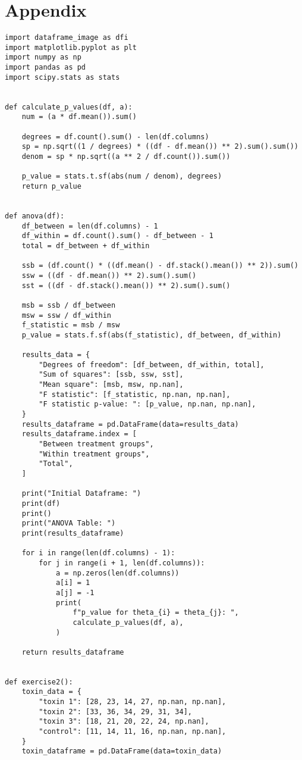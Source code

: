 \documentclass[letterpaper, 12pt]{article}
\begin{document}
\newpage
\section*{Appendix}
\begin{lstlisting}
import dataframe_image as dfi
import matplotlib.pyplot as plt
import numpy as np
import pandas as pd
import scipy.stats as stats


def calculate_p_values(df, a):
    num = (a * df.mean()).sum()

    degrees = df.count().sum() - len(df.columns)
    sp = np.sqrt((1 / degrees) * ((df - df.mean()) ** 2).sum().sum())
    denom = sp * np.sqrt((a ** 2 / df.count()).sum())

    p_value = stats.t.sf(abs(num / denom), degrees)
    return p_value


def anova(df):
    df_between = len(df.columns) - 1
    df_within = df.count().sum() - df_between - 1
    total = df_between + df_within

    ssb = (df.count() * ((df.mean() - df.stack().mean()) ** 2)).sum()
    ssw = ((df - df.mean()) ** 2).sum().sum()
    sst = ((df - df.stack().mean()) ** 2).sum().sum()

    msb = ssb / df_between
    msw = ssw / df_within
    f_statistic = msb / msw
    p_value = stats.f.sf(abs(f_statistic), df_between, df_within)

    results_data = {
        "Degrees of freedom": [df_between, df_within, total],
        "Sum of squares": [ssb, ssw, sst],
        "Mean square": [msb, msw, np.nan],
        "F statistic": [f_statistic, np.nan, np.nan],
        "F statistic p-value: ": [p_value, np.nan, np.nan],
    }
    results_dataframe = pd.DataFrame(data=results_data)
    results_dataframe.index = [
        "Between treatment groups",
        "Within treatment groups",
        "Total",
    ]

    print("Initial Dataframe: ")
    print(df)
    print()
    print("ANOVA Table: ")
    print(results_dataframe)

    for i in range(len(df.columns) - 1):
        for j in range(i + 1, len(df.columns)):
            a = np.zeros(len(df.columns))
            a[i] = 1
            a[j] = -1
            print(
                f"p_value for theta_{i} = theta_{j}: ",
                calculate_p_values(df, a),
            )

    return results_dataframe


def exercise2():
    toxin_data = {
        "toxin 1": [28, 23, 14, 27, np.nan, np.nan],
        "toxin 2": [33, 36, 34, 29, 31, 34],
        "toxin 3": [18, 21, 20, 22, 24, np.nan],
        "control": [11, 14, 11, 16, np.nan, np.nan],
    }
    toxin_dataframe = pd.DataFrame(data=toxin_data)


\end{lstlisting}
\end{document}
